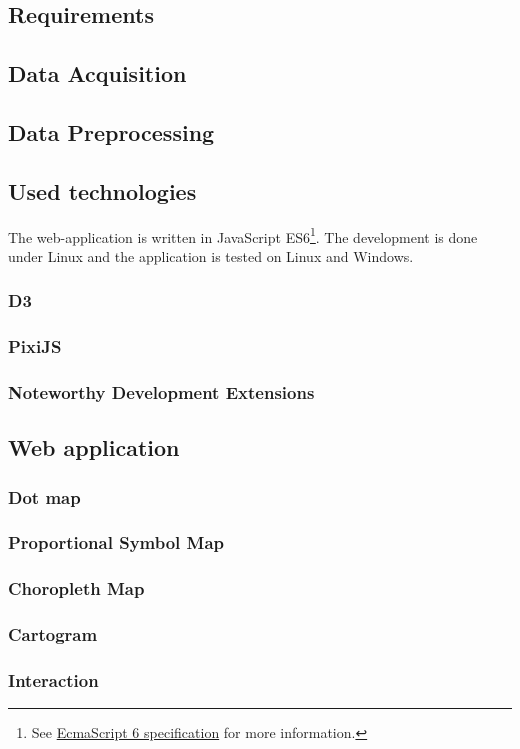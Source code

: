 \subsection{Requirements}


\subsection{Data Acquisition}
\label{s:data-acquisition}


\subsection{Data Preprocessing}
\label{s:data-preprocessing}


\subsection{Used technologies}
The web-application is written in JavaScript ES6\footnote{See \href{http://www.ecma-international.org/ecma-262/6.0/}{EcmaScript 6 specification} for more information.}. The development is done under Linux and the application is tested on Linux and Windows.

\subsubsection{D3}


\subsubsection{PixiJS}


\subsubsection{Noteworthy Development Extensions}


\subsection{Web application}
\label{s:web-application}



\subsubsection{Dot map}
\subsubsection{Proportional Symbol Map}
\subsubsection{Choropleth Map}
\subsubsection{Cartogram}
\subsubsection{Interaction}


